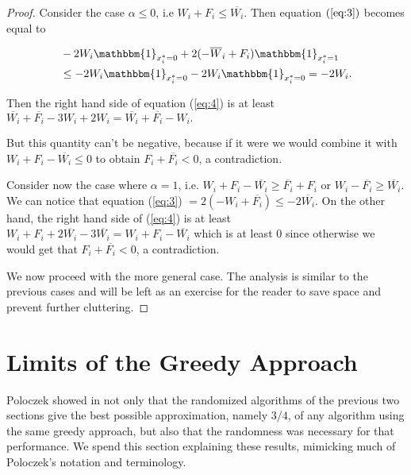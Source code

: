 \documentclass[11pt,letter]{article}
\numberwithin{theorem}{section}
\begin{document}
\begin{proof}
Consider the case $\alpha \leq 0$, i.e $W_i + F_i \leq \overline{W_i}$. Then equation $(\ref{eq:3})$ becomes equal to

\begin{equation*}
\begin{aligned}
& -2W_i \mathbbm{1}_{x_i^* = 0} + 2(-\overline{W}_i + F_i) \mathbbm{1}_{x_i^* = 1} \\
& \leq  -2W_i \mathbbm{1}_{x_i^* = 0} - 2W_i \mathbbm{1}_{x_i^* = 0} = -2W_i.
\end{aligned}
\end{equation*}

Then the right hand side of equation (\ref{eq:4}) is at least $\overline{W_i} + \overline{F_i} - 3W_i + 2W_i =
\overline{W_i} + \overline{F_i} - W_i.$

But this quantity can't be negative, because if it were we would combine it with $W_i + F_i - \overline{W_i} \leq 0$ to obtain $F_i +
\overline{F_i} < 0$, a contradiction.

Consider now the case where $\alpha = 1$, i.e. $W_i + F_i -\overline{W_i} \geq \overline{F_i} + F_i$ or $W_i - \overline{F_i} \geq \overline{W_i}$.
We can notice that equation (\ref{eq:3}) $= 2(-W_i + \overline{F_i}) \leq -2\overline{W_i}$. On the other hand, the right hand side of  (\ref{eq:4})
is at least $W_i + F_i + 2\overline{W_i} -3\overline{W_i} = W_i + F_i - \overline{W_i}$ which is at least $0$ since otherwise we would get
that $F_i + \overline{F_i} < 0$, a contradiction.

We now proceed with the more general case. The analysis is similar to the previous cases and will be left as an exercise
for the reader to save space and prevent further cluttering.
\end{proof}


\section{Limits of the Greedy Approach}\label{S:limits}

Poloczek showed in \cite{DBLP:conf/esa/Poloczek11} not only that
the randomized algorithms of the previous two sections
give the best possible approximation, namely $3/4$,
of any algorithm using the same greedy approach,
but also that the randomness was necessary for that performance.
We spend this section explaining these results,
mimicking much of Poloczek's notation and terminology.
\end{document}
